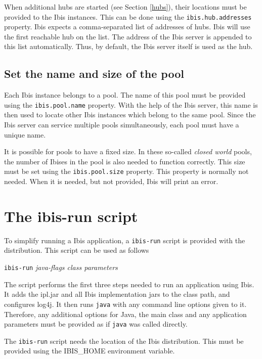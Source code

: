 \documentclass[a4paper,10pt]{article}
\begin{document}
When additional hubs are started (see Section \ref{hubs}), their locations 
must be provided to the Ibis instances. This can be done using 
the \texttt{ibis.hub.addresses} property. Ibis expects a comma-separated
list of addresses of hubs. Ibis will use the first reachable hub on the
list. The address of the Ibis server is appended to this list
automatically. Thus, by default, the Ibis server itself is used as the
hub.

\subsection{Set the name and size of the pool}

Each Ibis instance belongs to a pool. The name of this pool must be provided 
using the \texttt{ibis.pool.name} property. With the help of the Ibis server, 
this name is then used to locate other Ibis instances which belong to the
same pool. Since the Ibis server can service multiple pools simultaneously, 
each pool must have a unique name.

It is possible for pools to have a fixed size. In these so-called \emph{closed
world} pools, the number of Ibises in the pool is also needed to function 
correctly. This size must be set using the \texttt{ibis.pool.size} property. 
This property is normally not needed. When it is needed, but not provided, Ibis 
will print an error.

\section{The ibis-run script}

To simplify running a Ibis application, a \texttt{ibis-run} script is
provided with the distribution. This script can be
used as follows

\begin{center}
\texttt{ibis-run} \emph{java-flags class parameters}
\end{center}

The script performs the first three steps needed to run an application
using Ibis. It adds the ipl.jar and all Ibis implementation jars to the
class path, and configures log4j. It then runs \texttt{java} with any
command line options given to it. Therefore, any additional options for 
Java, the main class and any application parameters must be provided as 
if \texttt{java} was called directly.

The \texttt{ibis-run} script needs the location of the Ibis
distribution. This must be provided using the IBIS\_HOME environment
variable.
\end{document}
